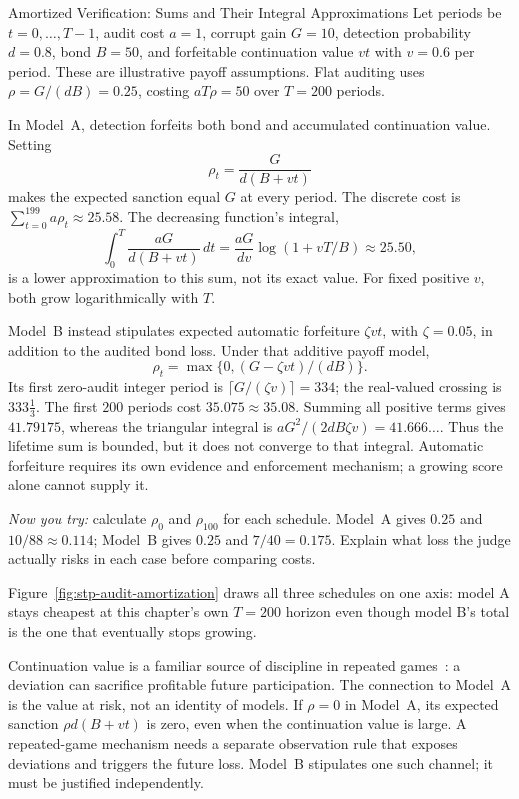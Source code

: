 \documentclass[11pt,a4paper]{article}
\theoremstyle{definition}
\begin{document}
\begin{pdexample}{Amortized Verification: Sums and Their Integral Approximations}
Let periods be $t=0,\ldots,T-1$, audit cost $a=1$, corrupt gain $G=10$, detection probability $d=0.8$, bond $B=50$, and forfeitable continuation value $vt$ with $v=0.6$ per period. These are illustrative payoff assumptions. Flat auditing uses $\rho=G/(dB)=0.25$, costing $aT\rho=50$ over $T=200$ periods.

In Model~A, detection forfeits both bond and accumulated continuation value. Setting
\[
\rho_t=\frac{G}{d(B+vt)}
\]
makes the expected sanction equal $G$ at every period. The discrete cost is $\sum_{t=0}^{199}a\rho_t\approx25.58$. The decreasing function's integral,
\[
\int_0^T\frac{aG}{d(B+vt)}\,dt
=\frac{aG}{dv}\log(1+vT/B)\approx25.50,
\]
is a lower approximation to this sum, not its exact value. For fixed positive $v$, both grow logarithmically with $T$.

Model~B instead stipulates expected automatic forfeiture $\zeta vt$, with $\zeta=0.05$, in addition to the audited bond loss. Under that additive payoff model,
\[
\rho_t=\max\{0,(G-\zeta vt)/(dB)\}.
\]
Its first zero-audit integer period is $\lceil G/(\zeta v)\rceil=334$; the real-valued crossing is $333\tfrac13$. The first $200$ periods cost $35.075\approx35.08$. Summing all positive terms gives $41.79175$, whereas the triangular integral is $aG^2/(2dB\zeta v)=41.666\ldots$. Thus the lifetime sum is bounded, but it does not converge to that integral. Automatic forfeiture requires its own evidence and enforcement mechanism; a growing score alone cannot supply it.

\emph{Now you try:} calculate $\rho_0$ and $\rho_{100}$ for each schedule. Model~A gives $0.25$ and $10/88\approx0.114$; Model~B gives $0.25$ and $7/40=0.175$. Explain what loss the judge actually risks in each case before comparing costs.
\end{pdexample}

Figure~\ref{fig:stp-audit-amortization} draws all three schedules on one axis:
model A stays cheapest at this chapter's own $T=200$ horizon even though model
B's total is the one that eventually stops growing.



Continuation value is a familiar source of discipline in repeated games~: a deviation can sacrifice profitable future participation. The connection to Model~A is the value at risk, not an identity of models. If $\rho=0$ in Model~A, its expected sanction $\rho d(B+vt)$ is zero, even when the continuation value is large. A repeated-game mechanism needs a separate observation rule that exposes deviations and triggers the future loss. Model~B stipulates one such channel; it must be justified independently.
\end{document}
